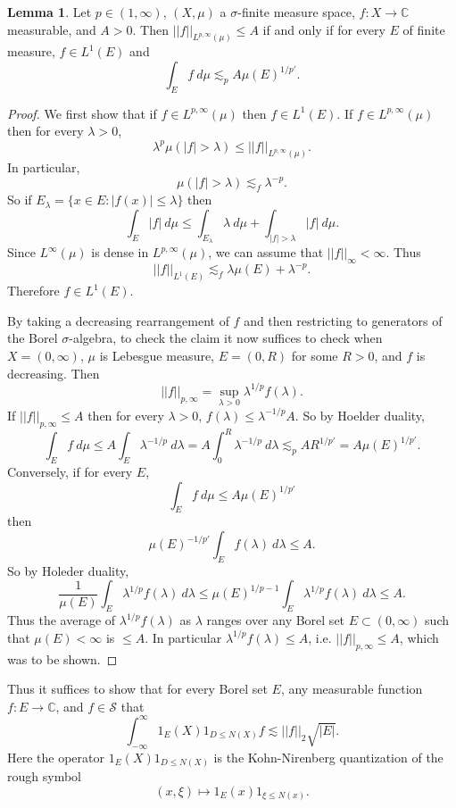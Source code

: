 \documentclass[12pt]{report}
\newcommand{\CC}{\mathbb{C}}
\newcommand{\Sch}{\mathcal{S}}
\theoremstyle{definition}
\newtheorem{lemma}[theorem]{Lemma}
\begin{document}
\begin{lemma}
Let $p \in (1, \infty)$, $(X, \mu)$ a $\sigma$-finite measure space, $f: X \to \CC$ measurable, and $A > 0$. Then $||f||_{L^{p,\infty}(\mu)} \leq A$ if and only if for every $E$ of finite measure, $f \in L^1(E)$ and
$$\int_E f ~d\mu \lesssim_p A\mu(E)^{1/p'}.$$
\end{lemma}
\begin{proof}
We first show that if $f \in L^{p, \infty}(\mu)$ then $f \in L^1(E)$. If $f \in L^{p, \infty}(\mu)$ then for every $\lambda > 0$,
$$\lambda^p \mu(|f| > \lambda) \leq ||f||_{L^{p, \infty}(\mu)}.$$
In particular,
$$\mu(|f| > \lambda) \lesssim_f \lambda^{-p}.$$
So if $E_\lambda = \{x \in E: |f(x)| \leq \lambda\}$ then
$$\int_E |f| ~d\mu \leq \int_{E_\lambda} \lambda ~d\mu + \int_{|f| > \lambda} |f|~d\mu.$$
Since $L^\infty(\mu)$ is dense in $L^{p, \infty}(\mu)$, we can assume that $||f||_\infty < \infty$. Thus
$$||f||_{L^1(E)} \lesssim_f \lambda \mu(E) + \lambda^{-p}.$$
Therefore $f \in L^1(E)$.

By taking a decreasing rearrangement of $f$ and then restricting to generators of the Borel $\sigma$-algebra, to check the claim it now suffices to check when $X = (0, \infty)$, $\mu$ is Lebesgue measure, $E = (0, R)$ for some $R > 0$, and $f$ is decreasing.
Then
$$||f||_{p, \infty} = \sup_{\lambda > 0} \lambda^{1/p} f(\lambda).$$
If $||f||_{p, \infty} \leq A$ then for every $\lambda > 0$, $f(\lambda) \leq \lambda^{-1/p}A$. So by Hoelder duality,
$$\int_E f~d\mu \leq A \int_E \lambda^{-1/p} ~d\lambda = A \int_0^R \lambda^{-1/p}~d\lambda \lesssim_p AR^{1/p'} = A\mu(E)^{1/p'}.$$
Conversely, if for every $E$,
$$\int_E f~d\mu \leq A\mu(E)^{1/p'}$$
then
$$\mu(E)^{-1/p'} \int_E f(\lambda) ~d\lambda \leq A.$$
So by Holeder duality,
$$\frac{1}{\mu(E)} \int_E \lambda^{1/p} f(\lambda) ~d\lambda \leq \mu(E)^{1/p-1} \int_E \lambda^{1/p} f(\lambda)~d\lambda \leq A.$$
Thus the average of $\lambda^{1/p} f(\lambda)$ as $\lambda$ ranges over any Borel set $E \subset (0, \infty)$ such that $\mu(E) < \infty$ is $\leq A$.
In particular $\lambda^{1/p} f(\lambda) \leq A$, i.e. $||f||_{p, \infty} \leq A$, which was to be shown.
\end{proof}

Thus it suffices to show that for every Borel set $E$, any measurable function $f: E \to \CC$, and $f \in \Sch$ that
$$\int_{-\infty}^\infty 1_E(X)1_{D\leq N(X)}f \lesssim ||f||_2\sqrt{|E|}.$$
Here the operator $1_E(X)1_{D\leq N(X)}$ is the Kohn-Nirenberg quantization of the rough symbol
$$(x, \xi) \mapsto 1_E(x)1_{\xi \leq N(x)}.$$
\end{document}

